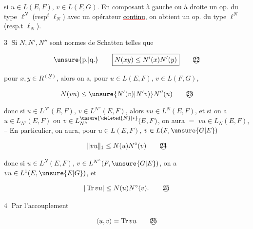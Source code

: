 si $u\in L(E,F)$, $v\in L(F,G)$.  En composant à gauche ou à droite un op.  du type $\ell^N$ (resp$^t$ $\ell_N$) avec un opérateur  \textcolor{red}{\uline{\textcolor{black}{continu}}}, on obtient un op. du type $\ell^N$ (resp.t $\ell_N$).

\textcircled{3}  Si $N,N',N''$ sont  normes de Schatten telles que

\[
\text{\unsure{p.|q.}}\qquad\boxed{N(xy)\leq N'(x)N'(y)}\tag*{\textcircled{22}}
\]

pour $x,y\in R^{(\underline N)}$, alors on a, pour $u\in L(E,F)$, $v\in L(F,G)$,

\[
N(vu)\leq \unsure{N'(v)|N'v)}N''(u)\tag*{\textcircled{23}}
\]

donc si $u\in L^{N'}(E,F)$, $v\in L^{N''}(E,F)$, alors $vu\in L^N(E,F)$, et si on a  $u\in L_{N'}(E,F)$ ou $v\in L_{N''}^{\unsure{\deleted{N}|*}}(E,F)$, on aura $=$ $vu\in L_N(E,F)$, -- En particulier, on aura, pour $u\in L(E,F)$, $v\in L(F,\unsure{G|E})$

\[
\lVert vu\rVert_1\leq N(u)N^\circ(v)\tag*{\textcircled{24}}
\]

donc si $u\in L^N(E,F)$, $v\in L^{N^\circ}(F,\unsure{G|E})$, on a $vu\in L^1(E,\unsure{E|G})$, et

\[
|\operatorname{Tr}vu|\leq N(u)N^\circ(v).\tag*{\textcircled{25}}
\]





\textcircled{4} Par l'accouplement 

\[
\langle u,v\rangle=\operatorname{Tr}vu\tag*{\textcircled{26}}
\]

